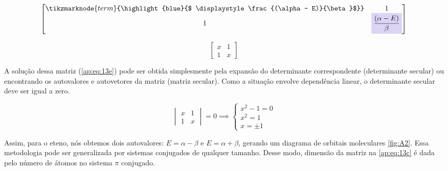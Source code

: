 \begin{figure}[htb]
    \vspace{3 \baselineskip}
\begin{equation}
\label{ap:eq:13d}
\begin{bmatrix}
    \displaystyle \tikzmarknode{term}{\highlight{blue}{$ \displaystyle \frac{(\alpha - E)}{\beta}$}} & 1 \\
    1  & \highlight{blue}{$\displaystyle \frac{(\alpha - E)}{\beta}$}
\end{bmatrix}
\end{equation}
\end{figure}

\begin{equation}
\label{ap:eq:13e}
\begin{bmatrix}
    x & 1 \\
    1  & x
\end{bmatrix}
\end{equation}

A solução dessa matriz (\autoref{ap:eq:13e}) pode ser obtida simplesmente pela expansão do determinante correspondente (determinante secular) ou encontrando os autovalores e autovetores da matriz (matriz secular). Como a situação envolve dependência linear, o determinante secular deve ser igual a zero.

\begin{equation}
    \begin{vmatrix}
    x & 1 \\
    1  & x
\end{vmatrix}
= 0 \implies
\begin{cases}
 x^2 - 1 = 0 \\
 x^2 = 1 \\
 x = \pm 1
\end{cases}
\end{equation}

Assim, para o eteno, nós obtemos dois autovalores: $E = \alpha - \beta$ e $E = \alpha + \beta$, gerando um diagrama de orbitais moleculares \autoref{fig:A2}. Essa metodologia pode ser generalizada por sistemas conjugados de qualquer tamanho. Desse modo, dimensão da matriz na \autoref{ap:eq:13c} é dada pelo número de átomos no sistema $\pi$ conjugado.

